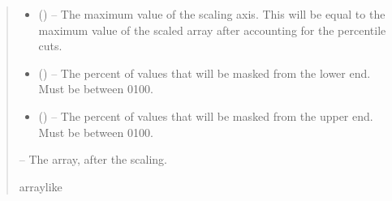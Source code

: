 \documentclass[letterpaper,11pt,english]{sphinxmanual}
\begin{document}
\begin{savenotes}
\begin{fulllineitems}
\begin{quote}
\begin{description}
\begin{itemize}
\item {} 
\sphinxAtStartPar
{} () – The maximum value of the scaling axis. This will be equal to the
maximum value of the scaled array after accounting for the percentile
cuts.

\item {} 
\sphinxAtStartPar
{} () – The percent of values that will be masked from the lower end. Must be
between 0\sphinxhyphen{}100.

\item {} 
\sphinxAtStartPar
{} () – The percent of values that will be masked from the upper end. Must be
between 0\sphinxhyphen{}100.

\end{itemize}

\sphinxAtStartPar
{} – The array, after the scaling.

\sphinxAtStartPar
array\sphinxhyphen{}like

\end{description}\end{quote}

\end{fulllineitems}\end{savenotes}

\end{document}
